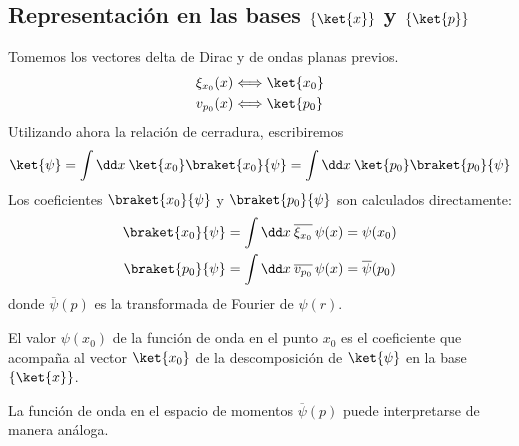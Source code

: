 \subsection*{Representación en las bases $\{ \ket{x}\}$ y $\{ \ket{p}\}$}
Tomemos los vectores delta de Dirac y de ondas planas previos.
\begin{align*}
\xi_{x_{0}} (x) & \Longleftrightarrow \ket{x_{0}} \\
v_{p_{0}} (x) & \Longleftrightarrow \ket{p_{0}}
\end{align*}
Utilizando ahora la relación de cerradura, escribiremos
\[ \ket{\psi} = \int \dd x \: \ket{x_{0}} \braket{x_{0}}{\psi} = \int \dd x \: \ket{p_{0}} \braket{p_{0}}{\psi} \]
Los coeficientes $\braket{x_0}{\psi}$ y $\braket{p_{0}}{\psi}$ son calculados directamente:
\begin{align*}
\braket{x_0}{\psi} &= \int \dd x \: \overline{\xi_{x_{0}}} \, \psi (x) =  \psi (x_{0}) \\
\braket{p_0}{\psi} &= \int \dd x \: \overline{v_{p_{0}}} \, \psi (x) =  \overline{\psi} (p_{0})
\end{align*}
donde $\overline{\psi} (p)$ es la transformada de Fourier de $\psi (r)$.
\par
El valor $\psi (x_{0})$ de la función de onda en el punto $x_{0}$ es el coeficiente que acompaña al vector $\ket{x_{0}}$ de la descomposición de $\ket{\psi}$ en la base $\{ \ket{x} \}$.
\par
La función de onda en el espacio de momentos $\overline{\psi} (p)$ puede interpretarse de manera análoga.
